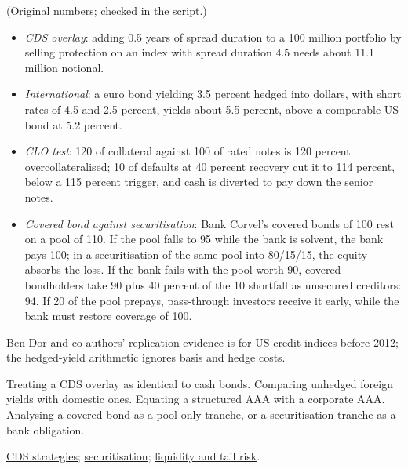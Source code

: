 \begin{qfmethod}
 (Original numbers; checked in the script.)
\begin{itemize}
\item \emph{CDS overlay}: adding 0.5 years of spread duration to a 100 million portfolio by selling protection on an index with spread duration 4.5 needs about 11.1 million notional.
\item \emph{International}: a euro bond yielding 3.5 percent hedged into dollars, with short rates of 4.5 and 2.5 percent, yields about 5.5 percent, above a comparable US bond at 5.2 percent.
\item \emph{CLO test}: 120 of collateral against 100 of rated notes is 120 percent overcollateralised; 10 of defaults at 40 percent recovery cut it to 114 percent, below a 115 percent trigger, and cash is diverted to pay down the senior notes.
\item \emph{Covered bond against securitisation}: Bank Corvel's covered bonds of 100 rest on a pool of 110. If the pool falls to 95 while the bank is solvent, the bank pays 100; in a securitisation of the same pool into 80/15/15, the equity absorbs the loss. If the bank fails with the pool worth 90, covered bondholders take 90 plus 40 percent of the 10 shortfall as unsecured creditors: 94. If 20 of the pool prepays, pass-through investors receive it early, while the bank must restore coverage of 100.
\end{itemize}

 Ben Dor and co-authors' replication evidence is for US credit indices before 2012; the hedged-yield arithmetic ignores basis and hedge costs.

 Treating a CDS overlay as identical to cash bonds. Comparing unhedged foreign yields with domestic ones. Equating a structured AAA with a corporate AAA. Analysing a covered bond as a pool-only tranche, or a securitisation tranche as a bank obligation.

 \hyperref[meth:cds-strategies]{CDS strategies}; \hyperref[def:securitisation-process]{securitisation}; \hyperref[meth:credit-liquidity-tail-risk]{liquidity and tail risk}.

\end{qfmethod}
